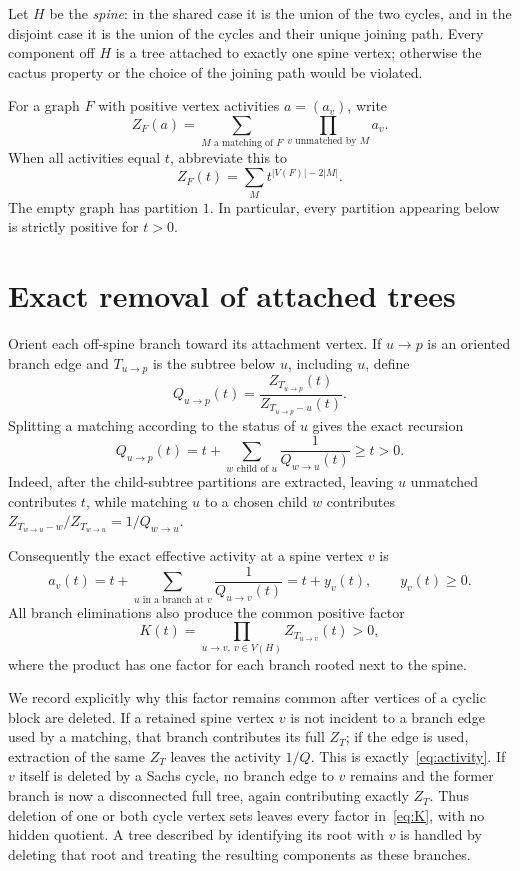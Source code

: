 \documentclass[11pt]{article}
\theoremstyle{remark}
\begin{document}
Let $H$ be the \emph{spine}: in the shared case it is the union of the two
cycles, and in the disjoint case it is the union of the cycles and their
unique joining path.  Every component off $H$ is a tree attached to exactly
one spine vertex; otherwise the cactus property or the choice of the joining
path would be violated.

For a graph $F$ with positive vertex activities $a=(a_v)$, write
\begin{equation}\label{eq:weighted-Z}
 Z_F(a)=\sum_{M\text{ a matching of }F}
          \prod_{v\text{ unmatched by }M}a_v.
\end{equation}
When all activities equal $t$, abbreviate this to
\[
 Z_F(t)=\sum_M t^{|V(F)|-2|M|}.
\]
The empty graph has partition $1$.  In particular, every partition appearing
below is strictly positive for $t>0$.

\section{Exact removal of attached trees}

Orient each off-spine branch toward its attachment vertex.  If $u\to p$ is
an oriented branch edge and $T_{u\to p}$ is the subtree below $u$, including
$u$, define
\[
 Q_{u\to p}(t)=
 \frac{Z_{T_{u\to p}}(t)}{Z_{T_{u\to p}-u}(t)}.
\]
Splitting a matching according to the status of $u$ gives the exact recursion
\begin{equation}\label{eq:BP}
 Q_{u\to p}(t)=t+\sum_{w\text{ child of }u}
                         \frac{1}{Q_{w\to u}(t)}\geq t>0.
\end{equation}
Indeed, after the child-subtree partitions are extracted, leaving $u$
unmatched contributes $t$, while matching $u$ to a chosen child $w$
contributes $Z_{T_{w\to u}-w}/Z_{T_{w\to u}}=1/Q_{w\to u}$.

Consequently the exact effective activity at a spine vertex $v$ is
\begin{equation}\label{eq:activity}
 a_v(t)=t+\sum_{u\text{ in a branch at }v}
                    \frac{1}{Q_{u\to v}(t)}=t+y_v(t),
 \qquad y_v(t)\geq0.
\end{equation}
All branch eliminations also produce the common positive factor
\begin{equation}\label{eq:K}
 K(t)=\prod_{u\to v,\ v\in V(H)} Z_{T_{u\to v}}(t)>0,
\end{equation}
where the product has one factor for each branch rooted next to the spine.

We record explicitly why this factor remains common after vertices of a
cyclic block are deleted.  If a retained spine vertex $v$ is not incident to
a branch edge used by a matching, that branch contributes its full
$Z_T$; if the edge is used, extraction of the same $Z_T$ leaves the activity
$1/Q$.  This is exactly~\eqref{eq:activity}.  If $v$ itself is deleted by a
Sachs cycle, no branch edge to $v$ remains and the former branch is now a
disconnected full tree, again contributing exactly $Z_T$.  Thus deletion of
one or both cycle vertex sets leaves every factor in~\eqref{eq:K}, with no
hidden quotient.  A tree described by identifying its root with $v$ is
handled by deleting that root and treating the resulting components as these
branches.
\end{document}
